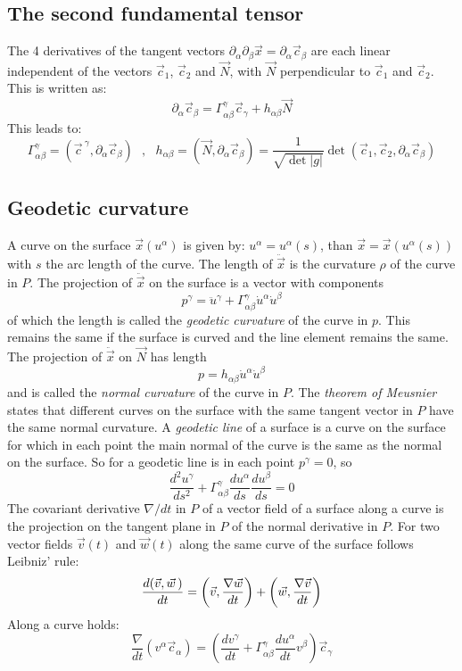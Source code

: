 \documentclass[twoside]{report}
\begin{document}
\subsection{The second fundamental tensor}
The 4 derivatives of the tangent vectors
$\partial_\alpha\partial_\beta\vec{x}=\partial_\alpha\vec{c}_\beta$ are each
linear independent of the vectors $\vec{c}_1$, $\vec{c}_2$ and $\vec{N}$, with
$\vec{N}$ perpendicular to $\vec{c}_1$ and $\vec{c}_2$. This is written as:
\[
\partial_\alpha\vec{c}_\beta=\Gamma^\gamma_{\alpha\beta}\vec{c}_\gamma+h_{\alpha\beta}\vec{N}
\]
This leads to:
\[
\Gamma^\gamma_{\alpha\beta}=(\vec{c}^{~\gamma},\partial_\alpha\vec{c}_\beta)~~~,~~~
h_{\alpha\beta}=(\vec{N},\partial_\alpha\vec{c}_\beta)=\frac{1}{\sqrt{\det|g|}}\det(\vec{c}_1,\vec{c}_2,\partial_\alpha\vec{c}_\beta)
\]

\subsection{Geodetic curvature}
A curve on the surface $\vec{x}(u^\alpha)$ is given by:
$u^\alpha=u^\alpha(s)$, than $\vec{x}=\vec{x}(u^\alpha(s))$ with $s$ the
arc length of the curve. The length of $\ddot{\vec{x}}$ is the curvature
$\rho$ of the curve in $P$. The projection of $\ddot{\vec{x}}$ on the surface
is a vector with components
\[
p^\gamma=\ddot{u}^\gamma+\Gamma^\gamma_{\alpha\beta}\dot{u}^\alpha\dot{u}^\beta
\]
of which the length is called the {\it geodetic curvature} of the curve in $p$.
This remains the same if the surface is curved and the line element remains the
same. The projection of $\ddot{\vec{x}}$ on $\vec{N}$ has length
\[
p=h_{\alpha\beta}\dot{u}^\alpha\dot{u}^\beta
\]
and is called the {\it normal curvature} of the curve in $P$. The {\it theorem
of Meusnier} states that different curves on the surface with the same tangent
vector in $P$ have the same normal curvature.
\npar
A {\it geodetic line} of a surface is a curve on the surface for which in each
point the main normal of the curve is the same as the normal on the surface.
So for a geodetic line is in each point $p^\gamma=0$, so
\[
\frac{d^2u^\gamma}{ds^2}+\Gamma^\gamma_{\alpha\beta}\frac{du^\alpha}{ds}\frac{du^\beta}{ds}=0
\]
The covariant derivative $\nabla/dt$ in $P$ of a vector field of a surface along
a curve is the projection on the tangent plane in $P$ of the normal derivative
in $P$.
\npar
For two vector fields $\vec{v}(t)$ and $\vec{w}(t)$ along the same curve of
the surface follows Leibniz' rule:
\[
\frac{d(\vec{v},\vec{w}\,)}{dt}=\left(\vec{v},\frac{\nabla\vec{w}}{dt}\right)+\left(\vec{w},\frac{\nabla\vec{v}}{dt}\right)
\]
Along a curve holds:
\[
\frac{\nabla}{dt}(v^\alpha\vec{c}_\alpha)=\left(\frac{dv^\gamma}{dt}+\Gamma^\gamma_{\alpha\beta}\frac{du^\alpha}{dt}v^\beta\right)\vec{c}_\gamma
\]
\end{document}
